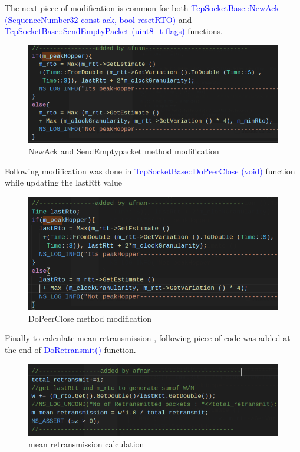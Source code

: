 \documentclass{article}[12pt]
\begin{document}
\begin{description}
    The next piece of modification is common for both \textcolor{blue}{TcpSocketBase::NewAck (SequenceNumber32 const ack, bool resetRTO)} and \textcolor{blue}{TcpSocketBase::SendEmptyPacket (uint8\_t flags)} functions.
    
    \begin{figure}[H]
    	\centering
    	\includegraphics[width=.9\textwidth]{Pictures/algo/tcp-socket-base4.png}
    	\caption{NewAck and SendEmptypacket method modification}
    \end{figure}   
    
    \newpage
    
    Following modification was done in \textcolor{blue}{TcpSocketBase::DoPeerClose (void)} function while updating the lastRtt value\\
    
    \begin{figure}[H]
    	\centering
    	\includegraphics[width=.9\textwidth]{Pictures/algo/tcp-socket-base5.png}
    	\caption{DoPeerClose method modification}
    \end{figure}   
    
  Finally to calculate mean retransmission , following piece of code was added at the end of \textcolor{blue}{DoRetransmit()} function.
    
    \begin{figure}[H]
    	\centering
    	\includegraphics[width=.9\textwidth]{Pictures/algo/tcp-socket-base6.png}
    	\caption{mean retransmission calculation}
    \end{figure}   
    
    
    
    
    \end{description}
\newpage
\end{document}
